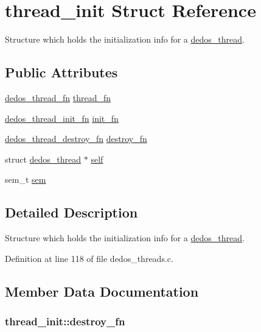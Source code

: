 \hypertarget{structthread__init}{\section{thread\-\_\-init Struct Reference}
\label{structthread__init}
}


Structure which holds the initialization info for a \hyperlink{structdedos__thread}{dedos\-\_\-thread}.  


\subsection*{Public Attributes}
\begin{DoxyCompactItemize}
\item 
\hyperlink{dedos__threads_8h_abc395397d24e50b8932e864465a17aa5}{dedos\-\_\-thread\-\_\-fn} \hyperlink{structthread__init_abbea592e098189df8940eb597cb53ecc}{thread\-\_\-fn}
\item 
\hyperlink{dedos__threads_8h_a05cf7cb0c2d44afe48767196d7554f55}{dedos\-\_\-thread\-\_\-init\-\_\-fn} \hyperlink{structthread__init_a3f5a046298ba770824a83f652ddbc7ae}{init\-\_\-fn}
\item 
\hyperlink{dedos__threads_8h_a8c7746e69f0ed91647b8d28e3e660c2a}{dedos\-\_\-thread\-\_\-destroy\-\_\-fn} \hyperlink{structthread__init_a29d61655e6d0917cc7e0293a596b4e84}{destroy\-\_\-fn}
\item 
struct \hyperlink{structdedos__thread}{dedos\-\_\-thread} $\ast$ \hyperlink{structthread__init_a35c0110fa8e8385bd0c6e823a7e5c30a}{self}
\item 
sem\-\_\-t \hyperlink{structthread__init_a609ec6696aaa7d760a8154ddee7e8a49}{sem}
\end{DoxyCompactItemize}


\subsection{Detailed Description}
Structure which holds the initialization info for a \hyperlink{structdedos__thread}{dedos\-\_\-thread}. 

Definition at line 118 of file dedos\-\_\-threads.\-c.



\subsection{Member Data Documentation}
\hypertarget{structthread__init_a29d61655e6d0917cc7e0293a596b4e84}{
\subsubsection[{destroy\-\_\-fn}]{ thread\-\_\-init\-::destroy\-\_\-fn}}\label{structthread__init_a29d61655e6d0917cc7e0293a596b4e84}


